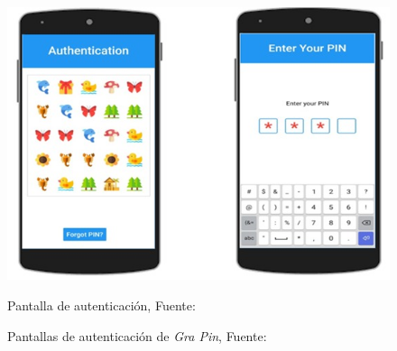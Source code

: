 \begin{anexos}
\begin{figure}[H]
\begin{minipage}[b]{0.4\linewidth}
		\includegraphics[width=\linewidth]{grapin-auth.jpg}
		\caption{Pantalla de autenticación, Fuente: \cite{kausar2022gra}}
		
	\end{minipage}
	\caption{Pantallas de autenticación de \textit{Gra Pin}, Fuente: \cite{kausar2022gra}}
	\label{gra-pin-screens}
\end{figure}


\end{anexos}
